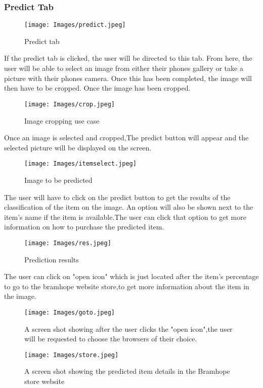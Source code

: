 \documentclass[a4paper, 12pt]{article}
\begin{document}
\subsubsection{Predict Tab}
\begin{figure}
\texttt{[image: Images/predict.jpeg]}
\centering
\caption{Predict tab} 
\end{figure}

If the predict tab is clicked, the user will be directed to this tab. From here, the user will be able to select an image from either their phones gallery or take a picture with their phones camera. Once this has been completed, the image will then have to be cropped. Once the image has been cropped.
\begin{figure}
\texttt{[image: Images/crop.jpeg]}
\centering
\caption{Image cropping use case} 
\end{figure}
Once an image is selected and cropped,The predict button will appear and the selected picture will be displayed on the screen.
\begin{figure}
\texttt{[image: Images/itemselect.jpeg]}
\centering
\caption{Image to be predicted} 
\end{figure}
The user will have to click on the predict button to get the results of the classification of the item on the image. An option will also be shown next to the item's name if the item is available.The user can click that option to get more information on how to purchase the predicted item.

\begin{figure}
\texttt{[image: Images/res.jpeg]}
\centering
\caption{Prediction results}
\end{figure}
The user can click on "open icon" which is just located after the item's percentage to go to the bramhope website store,to get more information about the item in the image.

\begin{figure}
\texttt{[image: Images/goto.jpeg]}
\centering
\caption{A screen shot showing after the user clicks the "open icon",the user will be requested to choose the browsers of their choice.}
\end{figure}

\begin{figure}
\texttt{[image: Images/store.jpeg]}
\centering
\caption{A screen shot showing the predicted item details in the Bramhope store website}
\end{figure}
\end{document}
